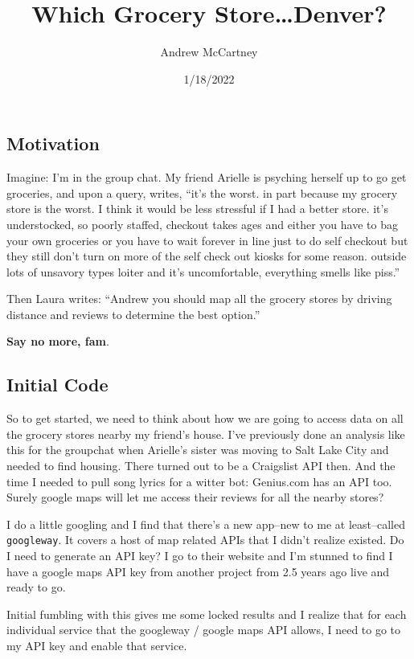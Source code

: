 \documentclass[]{tufte-handout}
\title{Which Grocery Store\ldots Denver?}
\author{Andrew McCartney}
\date{1/18/2022}
\begin{document}
\maketitle




\hypertarget{motivation}{%
\subsection{Motivation}\label{motivation}}

Imagine: I'm in the group chat. My friend Arielle is psyching herself up
to go get groceries, and upon a query, writes, ``it's the worst. in part
because my grocery store is the worst. I think it would be less
stressful if I had a better store. it's understocked, so poorly staffed,
checkout takes ages and either you have to bag your own groceries or you
have to wait forever in line just to do self checkout but they still
don't turn on more of the self check out kiosks for some reason. outside
lots of unsavory types loiter and it's uncomfortable, everything smells
like piss.''

Then Laura writes: ``Andrew you should map all the grocery stores by
driving distance and reviews to determine the best option.''

\textbf{Say no more, fam}.

\hypertarget{initial-code}{%
\subsection{Initial Code}\label{initial-code}}

So to get started, we need to think about how we are going to access
data on all the grocery stores nearby my friend's house. I've previously
done an analysis like this for the groupchat when Arielle's sister was
moving to Salt Lake City and needed to find housing. There turned out to
be a Craigslist API then. And the time I needed to pull song lyrics for
a witter bot: Genius.com has an API too. Surely google maps will let me
access their reviews for all the nearby stores?

I do a little googling and I find that there's a new app--new to me at
least--called \texttt{googleway}. It covers a host of map related APIs
that I didn't realize existed. Do I need to generate an API key? I go to
their website and I'm stunned to find I have a google maps API key from
another project from 2.5 years ago live and ready to go.

Initial fumbling with this gives me some locked results and I realize
that for each individual service that the googleway / google maps API
allows, I need to go to my API key and enable that service.
\end{document}
